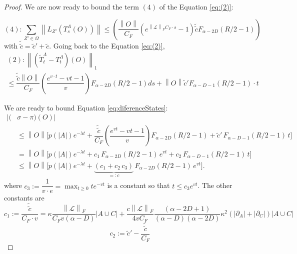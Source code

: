 \documentclass[10pt,a4paper]{amsart}
\newcommand{\Li}{\mathcal{L}}
\newcommand{\T}{T^\Lambda}
\newcommand{\TT}{\widetilde{T}^\Lambda}
\newcommand{\abs}[1]{\left \vert#1\right\vert}
\newcommand{\norm}[1]{\left\lVert#1\right\rVert}
\newcommand{\normm}[2]{\left\lVert#1\right\rVert_{#2}}
\begin{document}
\begin{proof}
    We are now ready to bound the term $(4)$ of the Equation \eqref{eq:(2)}:
     
     \begin{equation}
         (4):\sum_{Z'\in \Omega} \norm{L_{Z'}(\T_s(O))}\leq\left ( \dfrac{\norm{O}}{C_F}\left ( e^{\normm{\Li}{F} C_F\cdot s}-1\right )\tilde{\tilde{c}}F_{\alpha-2D}(R/2-1)\right )
     \end{equation}
     with $
         \tilde{\tilde{c}}=\tilde{c}'+\tilde{c}
    $. Going back to the Equation \eqref{eq:(2)},
    \begin{multline}
        (2):\normm{(\TT_t-\T_t)(O)}{1}\\\leq  \dfrac{\tilde{\tilde{c}}\norm{O}}{C_F}\left ( \dfrac{e^{v\cdot t}-vt-1}{v} \right )F_{\alpha-2D}(R/2-1)ds        +\norm{O}\tilde{c}' F_{\alpha-D-1}(R/2-1)\cdot t
        \label{eq:clusteringTime}
     \end{multline}

     We are ready to bound Equation \eqref{eq:diferenceStates}:
    \begin{align}
|(&\sigma-\pi)(O)|\\
&\nonumber \le \norm{O}\Bigg[ p(\abs{A})e^{-\lambda t} + \dfrac{\tilde{\tilde{c}}}{C_F}\left(\dfrac{e^{vt}-vt-1}{v}\right)F_{\alpha-2D}(R/2-1) + \tilde{c}'\,F_{\alpha-D-1}(R/2-1)\,t \Bigg]
\\
&= \norm{O}\Big[ p(\abs{A})e^{-\lambda t} + c_1\,F_{\alpha-2D}(R/2-1)\,e^{vt} + c_2\,F_{\alpha-D-1}(R/2-1)\,t \Big] \nonumber\\
&\le \norm{O}\Big[ p(\abs{A})e^{-\lambda t} + \underbrace{(c_1+c_2\,c_3)}_{=:c}\,F_{\alpha-2D}(R/2-1)\,e^{vt} \Big]. \nonumber
\end{align}
     where $c_3:=\dfrac{1}{v\cdot e}=\max_{t\geq 0} t e^{-vt}$ is a constant so that $t\leq c_3 e^{vt}$. The other constants are
     \begin{equation}
         c_1:= \dfrac{\tilde{\tilde{c}}}{C_F \cdot v}=\kappa \dfrac{\normm{\Li}{F}}{C_Fv(\alpha-D)}\abs{A\cup C}+\dfrac{c\normm{\Li}{F}}{4vC_F}\dfrac{(\alpha-2D +1)}{(\alpha-D )(\alpha-2D)}\kappa^2 (\abs{\partial_{A}}+\abs{\partial_{C}})\abs{A\cup C}
     \end{equation}
     \begin{equation}
         c_2:= \tilde{c}'-\dfrac{\tilde{\tilde{c}}}{C_F}
     \end{equation}


\end{proof}
\end{document}

